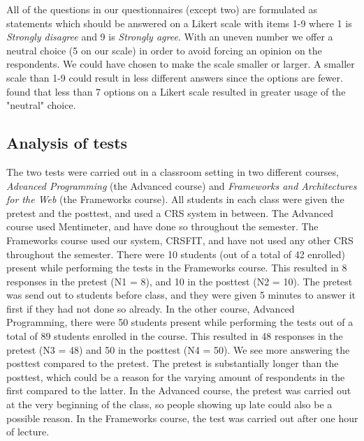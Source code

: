 All of the questions in our questionnaires (except two) are formulated as statements which should be answered on a Likert scale \cite{likert1932technique} with items 1-9 where 1 is \emph{Strongly disagree} and 9 is \emph{Strongly agree}. With an uneven number we offer a neutral choice (5 on our scale) in order to avoid forcing an opinion on the respondents. We could have chosen to make the scale smaller or larger. A smaller scale than 1-9 could result in less different answers since the options are fewer.  found that less than 7 options on a Likert scale resulted in greater usage of the "neutral" choice. %




\subsection{Analysis of tests}

The two tests were carried out in a classroom setting in two different courses, \emph{Advanced Programming} (the Advanced course) and \emph{Frameworks and Architectures for the Web} (the Frameworks course). All students in each class were given the pretest and the posttest, and used a CRS system in between. The Advanced course used Mentimeter, and have done so throughout the semester. The Frameworks course used our system, CRSFIT, and have not used any other CRS throughout the semester.
There were 10 students (out of a total of 42 enrolled) present while performing the tests in the Frameworks course. This resulted in 8 responses in the pretest (N1 = 8), and 10 in the posttest (N2 = 10). The pretest was send out to students before class, and they were given 5 minutes to answer it first if they had not done so already.
In the other course, Advanced Programming, there were 50 students present while performing the tests out of a total of 89 students enrolled in the course. This resulted in 48 responses in the pretest (N3 = 48) and 50 in the posttest (N4 = 50). We see more answering the posttest compared to the pretest. The pretest is substantially longer than the posttest, which could be a reason for the varying amount of respondents in the first compared to the latter. In the Advanced course, the pretest was carried out at the very beginning of the class, so people showing up late could also be a possible reason. In the Frameworks course, the test was carried out after one hour of lecture.

